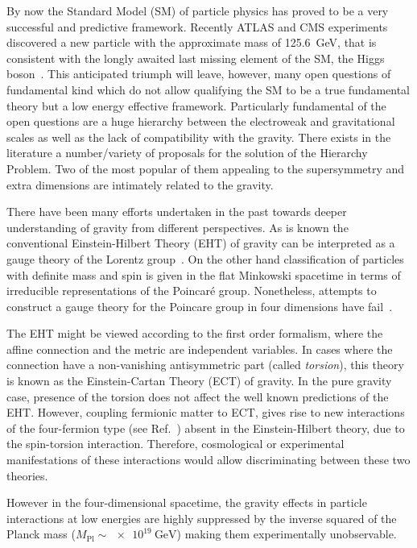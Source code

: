 \documentclass[twocolumn,showpacs,showkeys,prd,superscriptaddress]{revtex4-1}
\begin{document}
By now the Standard Model (SM) of particle physics has proved to be a very successful and predictive framework. Recently ATLAS and CMS experiments discovered a new particle with the approximate mass of \SI{125.6}{\GeV}, that is consistent with the longly awaited last missing element of the SM, the Higgs boson~\cite{Aad:2012tfa,Chatrchyan:2012ufa}.
This anticipated triumph will leave, however, many open questions of fundamental kind which do not allow qualifying the SM to be a true fundamental theory but a low energy effective framework. Particularly fundamental of the open questions are a huge hierarchy between the electroweak and gravitational scales as well as the lack of compatibility with the gravity.  There exists in the literature a number/variety of  proposals for the solution of the Hierarchy Problem.  Two of the  most popular of them appealing to the supersymmetry and extra dimensions  are intimately related to the gravity.

There have been many efforts undertaken in the past towards deeper understanding of gravity from different perspectives. As is known the conventional Einstein-Hilbert Theory (EHT)  of gravity can be interpreted as a gauge theory of the Lorentz group~\cite{PhysRev.101.1597}.
On the other hand  classification of particles with definite mass and spin is given in  the flat Minkowski spacetime  in terms of irreducible representations of the Poincar\'e group. Nonetheless, attempts to  construct a gauge theory for the Poincare group in four dimensions have fail~\cite{Kibble:1961ba,PhysRevLett.33.445,PhysRevD.13.3192,PhysRevLett.38.739}.


The EHT might be viewed according to the first order formalism, where the affine connection and the metric are independent variables.  In  cases where the connection  have a non-vanishing antisymmetric part (called \textit{torsion}), this theory is known as the Einstein-Cartan Theory (ECT) of gravity. In the pure gravity case, presence of the torsion does not affect the well known predictions of the EHT. However, coupling fermionic matter to ECT, gives rise to new interactions of the four-fermion type  (see Ref.~\cite{Kibble:1961ba}) absent in the Einstein-Hilbert theory, due to the spin-torsion interaction. Therefore, cosmological or experimental manifestations of these interactions would allow discriminating between these two theories.

However in the four-dimensional spacetime,  the gravity effects in particle interactions at low energies are highly suppressed by the inverse squared of the  Planck mass ($M_{\text{Pl}}\sim\SI{e19}{\GeV}$) making them experimentally unobservable. 
\end{document}

